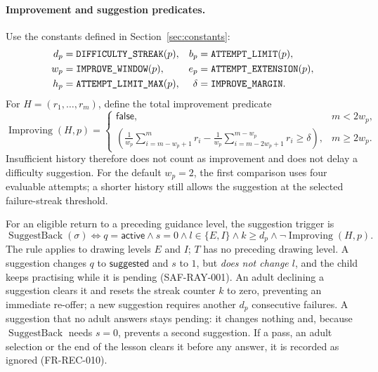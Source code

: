 \documentclass[12pt]{article}
\renewcommand{\_}{\textunderscore\allowbreak}%
\begin{document}
\paragraph{Improvement and suggestion predicates.}
Use the constants defined in Section~\ref{sec:constants}:
\[
\begin{aligned}
d_p &= \texttt{DIFFICULTY\_\allowbreak STREAK}(p), &
 b_p &= \texttt{ATTEMPT\_\allowbreak LIMIT}(p),\\
w_p &= \texttt{IMPROVE\_\allowbreak WINDOW}(p), &
 e_p &= \texttt{ATTEMPT\_\allowbreak EXTENSION}(p),\\
 h_p &= \texttt{ATTEMPT\_\allowbreak LIMIT\_\allowbreak MAX}(p), &
 \delta &= \texttt{IMPROVE\_\allowbreak MARGIN}.
\end{aligned}
\]
For $H=(r_1,\ldots,r_m)$, define the total improvement predicate
\[
\operatorname{Improving}(H,p)=
\begin{cases}
\textsf{false}, & m<2w_p,\\
\displaystyle
\left(\frac{1}{w_p}\sum_{i=m-w_p+1}^{m} r_i
-\frac{1}{w_p}\sum_{i=m-2w_p+1}^{m-w_p}r_i\ge\delta\right),
& m\ge 2w_p.
\end{cases}
\]
Insufficient history therefore does not count as improvement and does not delay
a difficulty suggestion. For the default $w_p=2$, the first comparison uses four
evaluable attempts; a shorter history still allows the suggestion at the
selected failure-streak threshold.

For an eligible return to a preceding guidance level, the suggestion trigger is
\[
\operatorname{SuggestBack}(\sigma)\iff
q=\textsf{active}\land s=0\land l\in\{E,I\}\land k\ge d_p
\land\neg\operatorname{Improving}(H,p).
\]
The rule applies to drawing levels $E$ and $I$; $T$ has no preceding drawing
level. A suggestion changes $q$ to $\textsf{suggested}$ and $s$ to $1$, but
\emph{does not change $l$}, and the child keeps practising while it is pending
(SAF-RAY-001). An adult declining a suggestion clears it and resets the streak
counter $k$ to zero, preventing an immediate re-offer; a new suggestion requires
another $d_p$ consecutive failures. A suggestion that no adult answers stays
pending: it changes nothing and, because $\operatorname{SuggestBack}$ needs
$s=0$, prevents a second suggestion. If a pass, an adult selection or the end of
the lesson clears it before any answer, it is recorded as ignored
(FR-REC-010).
\end{document}
